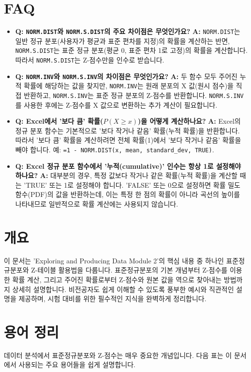 \documentclass[11pt,a4paper]{book}
\providecommand{\newsection}{\section}
\theoremstyle{definition}
\begin{document}
\newsection{FAQ}

\begin{itemize}
    \item \textbf{Q: \texttt{NORM.DIST}와 \texttt{NORM.S.DIST}의 주요 차이점은 무엇인가요?}
    \textbf{A:} \texttt{NORM.DIST}는 일반 정규 분포(사용자가 평균과 표준 편차를 지정)의 확률을 계산하는 반면, \texttt{NORM.S.DIST}는 표준 정규 분포(평균 0, 표준 편차 1로 고정)의 확률을 계산합니다. 따라서 \texttt{NORM.S.DIST}는 Z-점수만을 인수로 받습니다.

    \item \textbf{Q: \texttt{NORM.INV}와 \texttt{NORM.S.INV}의 차이점은 무엇인가요?}
    \textbf{A:} 두 함수 모두 주어진 누적 확률에 해당하는 값을 찾지만, \texttt{NORM.INV}는 원래 분포의 X 값(원시 점수)을 직접 반환하고, \texttt{NORM.S.INV}는 표준 정규 분포의 Z-점수를 반환합니다. \texttt{NORM.S.INV}를 사용한 후에는 Z-점수를 X 값으로 변환하는 추가 계산이 필요합니다.

    \item \textbf{Q: Excel에서 '보다 큼' 확률($P(X \ge x)$)을 어떻게 계산하나요?}
    \textbf{A:} Excel의 정규 분포 함수는 기본적으로 '보다 작거나 같음' 확률(누적 확률)을 반환합니다. 따라서 '보다 큼' 확률을 계산하려면 전체 확률(1)에서 '보다 작거나 같음' 확률을 빼야 합니다. 예: \texttt{=1 - NORM.DIST(x, mean, standard\_dev, TRUE)}.

    \item \textbf{Q: Excel 정규 분포 함수에서 '누적(cumulative)' 인수는 항상 1로 설정해야 하나요?}
    \textbf{A:} 대부분의 경우, 특정 값보다 작거나 같은 확률(누적 확률)을 계산할 때는 'TRUE' 또는 1로 설정해야 합니다. 'FALSE' 또는 0으로 설정하면 확률 밀도 함수(PDF)의 값을 반환하는데, 이는 특정 한 점의 확률이 아니라 곡선의 높이를 나타내므로 일반적으로 확률 계산에는 사용되지 않습니다.
\end{itemize}

\newsection*{개요}
이 문서는 'Exploring and Producing Data Module 2'의 핵심 내용 중 하나인 표준정규분포와 Z-테이블 활용법을 다룹니다. 표준정규분포의 기본 개념부터 Z-점수를 이용한 확률 계산, 그리고 주어진 확률로부터 Z-점수와 원본 값을 역으로 찾아내는 방법까지 상세히 설명합니다. 비전공자도 쉽게 이해할 수 있도록 풍부한 예시와 직관적인 설명을 제공하며, 시험 대비를 위한 필수적인 지식을 완벽하게 정리합니다.

\newsection*{용어 정리}
데이터 분석에서 표준정규분포와 Z-점수는 매우 중요한 개념입니다. 다음 표는 이 문서에서 사용되는 주요 용어들을 쉽게 설명합니다.
\end{document}
